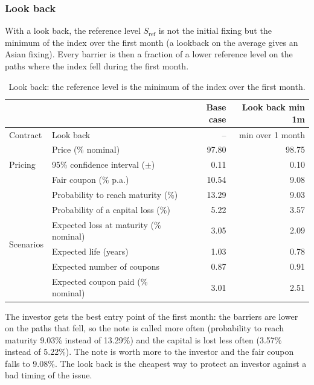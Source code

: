 \documentclass[11pt,a4paper]{article}
\newcommand{\Sref}{S_{\mathrm{ref}}}
\begin{document}
\clearpage
\subsubsection{Look back}

With a look back, the reference level $\Sref$ is not the initial fixing but the minimum of the index over the first
month (a lookback on the average gives an Asian fixing). Every barrier is then a fraction of a lower reference level
on the paths where the index fell during the first month.

\begin{table}[htbp]
  \centering
  \small
  \begin{tabular}{llrr}
    \toprule
     & & \textbf{Base case} & \textbf{Look back min 1m} \\
    \midrule
    \multirow{1}{*}{Contract}
      & Look back & -- & min over 1 month \\
    \midrule
    \multirow{3}{*}{Pricing}
      & Price (\% nominal) & 97.80 & 98.75 \\
      & 95\% confidence interval ($\pm$) & 0.11 & 0.10 \\
      & Fair coupon (\% p.a.) & 10.54 & 9.08 \\
    \midrule
    \multirow{6}{*}{Scenarios}
      & Probability to reach maturity (\%) & 13.29 & 9.03 \\
      & Probability of a capital loss (\%) & 5.22 & 3.57 \\
      & Expected loss at maturity (\% nominal) & 3.05 & 2.09 \\
      & Expected life (years) & 1.03 & 0.78 \\
      & Expected number of coupons & 0.87 & 0.91 \\
      & Expected coupon paid (\% nominal) & 3.01 & 2.51 \\
    \bottomrule
  \end{tabular}
  \caption{Look back: the reference level is the minimum of the index over the first month.}
  \label{tab:athena-lookback}
\end{table}

The investor gets the best entry point of the first month: the barriers are lower on the paths that fell, so the
note is called more often (probability to reach maturity 9.03\% instead of 13.29\%) and the capital is lost less often
(3.57\% instead of 5.22\%). The note is worth more to the investor and the fair coupon falls to 9.08\%. The look back
is the cheapest way to protect an investor against a bad timing of the issue.
\end{document}
